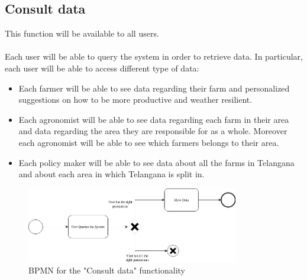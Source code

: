 \documentclass[10pt]{report}
\begin{document}
\subsection{Consult data}
This function will be available to all users.\\ \\
Each user will be able to query the system in order to retrieve data. In particular, each user will be able to access different type of data:
\begin{itemize}
    \item Each farmer will be able to see data regarding their farm and personalized suggestions on how to be more productive and weather resilient.
    \item Each agronomist will be able to see data regarding each farm in their area and data regarding the area they are responsible for as a whole. Moreover each agronomist will be able to see which farmers belongs to their area.
    \item Each policy maker will be able to see data about all the farms in Telangana and about each area in which Telangana is split in.
\end{itemize}
\begin{figure}[H]
    \centering
    \includegraphics[width=350px]{BPMN/BPMN 222.jpg}
    \caption{BPMN for the "Consult data" functionality}
\end{figure}
\end{document}
